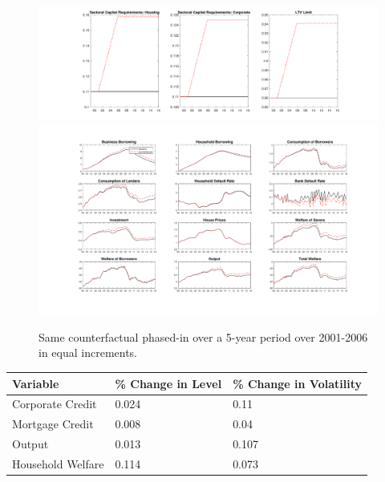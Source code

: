 \documentclass[12pt]{article}
\numberwithin{equation}{section}
\begin{document}
\begin{figure}[H]
\centering
\caption{Same counterfactual phased-in over a 5-year period over 2001-2006 in equal increments.}
\includegraphics[scale=0.35]{CF_policy_rules10.pdf}
\includegraphics[scale=0.4]{main_counterfactual_phaseIn.pdf}\\

\end{figure}


\begin{table}[h]

\begin{tabular}{l|l|l}
\small
Variable & \% Change in Level & \% Change in Volatility \\
\hline
\hline
    Corporate Credit           &       0.024   &      0.11 \\
    Mortgage Credit            &      0.008    &      0.04 \\
    Output         				&     0.013    &      0.107 \\ 
    Household Welfare       &         0.114     &     0.073\\
\end{tabular}
\end{table}
\end{document}
